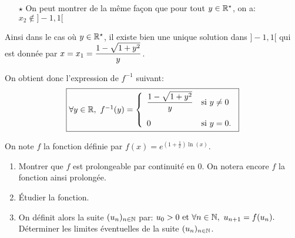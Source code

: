 \documentclass[a4paper, 11pt,reqno]{article}
\begin{document}
\begin{correction}
\begin{enumerate}
\begin{itemize}
\begin{itemize}
				            \item[$\star$] On peut montrer de la m\^{e}me fa\c{c}on que pour tout $y\in\mathbb{R}^{\star}$, on a: $x_2\notin\rbrack -1,1\lbrack$
			            \end{itemize}
			            Ainsi dans le cas o\`{u} $y\in\mathbb{R}^{\star}$, il existe bien une unique solution dans $\rbrack -1,1\lbrack$ qui est donn\'ee par $x=x_1=\displaystyle\frac{1-\sqrt{1+y^2}}{y}$.
		      \end{itemize}
		      On obtient donc l'expression de $f^{-1}$ suivant:
		      $$\fbox{$
					      \forall y\in\R,\ f^{-1}(y)=\left\lbrace\begin{array}{ll}
						      \ddp\frac{1-\sqrt{1+y^2}}{y} & \hbox{si}\ y\not= 0\vsec \\
						      0                            & \hbox{si}\ y=0.
					      \end{array}\right.
				      $}$$

	\end{enumerate}
\end{correction}
\begin{exercice}  \;
	\noindent On note $f$ la fonction d\'efinie par $f(x)=e^{(1+\frac{1}{x})\ln{(x)}}$.
	\begin{enumerate}
		\item Montrer que $f$ est prolongeable par continuit\'e en 0. On notera encore $f$ la fonction ainsi prolong\'ee.
		\item \'Etudier la fonction.
		\item On d\'efinit alors la suite $(u_n)_{n\in \mathbb{N}}$ par: $u_0>0\ \hbox{et}\ \forall n\in\N,\ u_{n+1}=f(u_n).$
		      D\'eterminer les limites \'eventuelles de la suite $(u_n)_{n\in \mathbb{N}}$.
	\end{enumerate}
\end{exercice}
\end{document}
